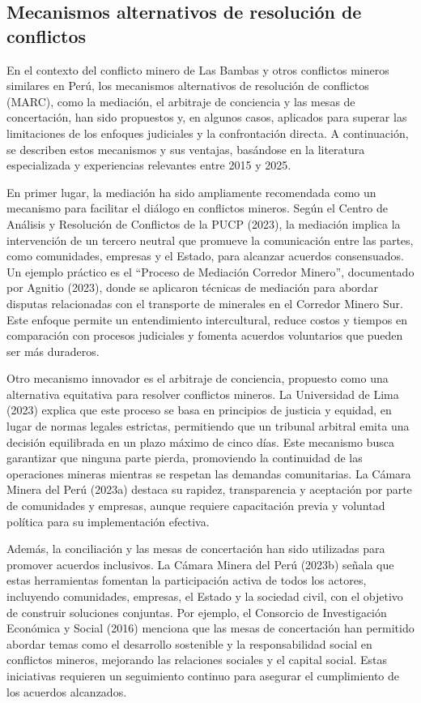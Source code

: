 \documentclass[
  stu,
  floatsintext,
  longtable,
  a4paper,
  nolmodern,
  notxfonts,
  notimes,
  colorlinks=true,linkcolor=blue,citecolor=blue,urlcolor=blue]{apa7}
\begin{document}
\subsection{Mecanismos alternativos de resolución de
conflictos}\label{mecanismos-alternativos-de-resoluciuxf3n-de-conflictos}

En el contexto del conflicto minero de Las Bambas y otros conflictos
mineros similares en Perú, los mecanismos alternativos de resolución de
conflictos (MARC), como la mediación, el arbitraje de conciencia y las
mesas de concertación, han sido propuestos y, en algunos casos,
aplicados para superar las limitaciones de los enfoques judiciales y la
confrontación directa. A continuación, se describen estos mecanismos y
sus ventajas, basándose en la literatura especializada y experiencias
relevantes entre 2015 y 2025.

En primer lugar, la mediación ha sido ampliamente recomendada como un
mecanismo para facilitar el diálogo en conflictos mineros. Según el
Centro de Análisis y Resolución de Conflictos de la PUCP (2023), la
mediación implica la intervención de un tercero neutral que promueve la
comunicación entre las partes, como comunidades, empresas y el Estado,
para alcanzar acuerdos consensuados. Un ejemplo práctico es el ``Proceso
de Mediación Corredor Minero'', documentado por Agnitio (2023), donde se
aplicaron técnicas de mediación para abordar disputas relacionadas con
el transporte de minerales en el Corredor Minero Sur. Este enfoque
permite un entendimiento intercultural, reduce costos y tiempos en
comparación con procesos judiciales y fomenta acuerdos voluntarios que
pueden ser más duraderos.

Otro mecanismo innovador es el arbitraje de conciencia, propuesto como
una alternativa equitativa para resolver conflictos mineros. La
Universidad de Lima (2023) explica que este proceso se basa en
principios de justicia y equidad, en lugar de normas legales estrictas,
permitiendo que un tribunal arbitral emita una decisión equilibrada en
un plazo máximo de cinco días. Este mecanismo busca garantizar que
ninguna parte pierda, promoviendo la continuidad de las operaciones
mineras mientras se respetan las demandas comunitarias. La Cámara Minera
del Perú (2023a) destaca su rapidez, transparencia y aceptación por
parte de comunidades y empresas, aunque requiere capacitación previa y
voluntad política para su implementación efectiva.

Además, la conciliación y las mesas de concertación han sido utilizadas
para promover acuerdos inclusivos. La Cámara Minera del Perú (2023b)
señala que estas herramientas fomentan la participación activa de todos
los actores, incluyendo comunidades, empresas, el Estado y la sociedad
civil, con el objetivo de construir soluciones conjuntas. Por ejemplo,
el Consorcio de Investigación Económica y Social (2016) menciona que las
mesas de concertación han permitido abordar temas como el desarrollo
sostenible y la responsabilidad social en conflictos mineros, mejorando
las relaciones sociales y el capital social. Estas iniciativas requieren
un seguimiento continuo para asegurar el cumplimiento de los acuerdos
alcanzados.
\end{document}
